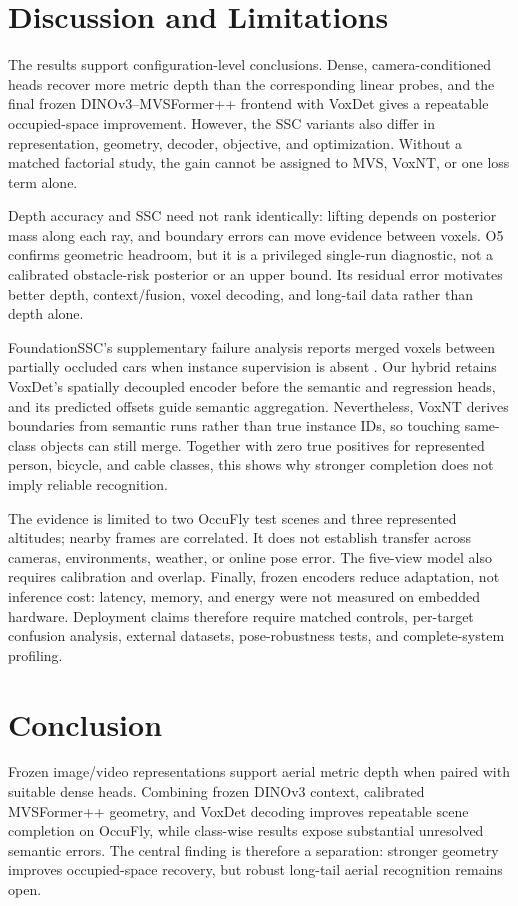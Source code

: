 \section{Discussion and Limitations}
\label{sec:discussion}

The results support configuration-level conclusions. Dense, camera-conditioned heads recover more metric depth than the corresponding linear probes, and the final frozen DINOv3--MVSFormer++ frontend with VoxDet gives a repeatable occupied-space improvement. However, the SSC variants also differ in representation, geometry, decoder, objective, and optimization. Without a matched factorial study, the gain cannot be assigned to MVS, VoxNT, or one loss term alone.

Depth accuracy and SSC need not rank identically: lifting depends on posterior mass along each ray, and boundary errors can move evidence between voxels. O5 confirms geometric headroom, but it is a privileged single-run diagnostic, not a calibrated obstacle-risk posterior or an upper bound. Its residual error motivates better depth, context/fusion, voxel decoding, and long-tail data rather than depth alone.

FoundationSSC's supplementary failure analysis reports merged voxels between partially occluded cars when instance supervision is absent \cite{chen2025foundationssc}. Our hybrid retains VoxDet's spatially decoupled encoder before the semantic and regression heads, and its predicted offsets guide semantic aggregation. Nevertheless, VoxNT derives boundaries from semantic runs rather than true instance IDs, so touching same-class objects can still merge. Together with zero true positives for represented person, bicycle, and cable classes, this shows why stronger completion does not imply reliable recognition.

The evidence is limited to two OccuFly test scenes and three represented altitudes; nearby frames are correlated. It does not establish transfer across cameras, environments, weather, or online pose error. The five-view model also requires calibration and overlap. Finally, frozen encoders reduce adaptation, not inference cost: latency, memory, and energy were not measured on embedded hardware. Deployment claims therefore require matched controls, per-target confusion analysis, external datasets, pose-robustness tests, and complete-system profiling.

\section{Conclusion}
\label{sec:conclusion}
Frozen image/video representations support aerial metric depth when paired with suitable dense heads. Combining frozen DINOv3 context, calibrated MVSFormer++ geometry, and VoxDet decoding improves repeatable scene completion on OccuFly, while class-wise results expose substantial unresolved semantic errors. The central finding is therefore a separation: stronger geometry improves occupied-space recovery, but robust long-tail aerial recognition remains open.
